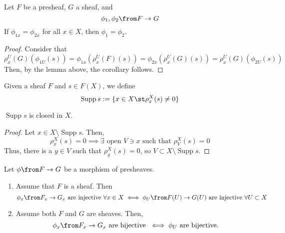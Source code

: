 \documentclass[11pt,leqno,oneside]{amsbook}
\renewcommand{\F}{F} %
\newcommand{\G}{G}
\DeclareMathOperator{\Supp}{Supp} %
\numberwithin{thm}{section}
\begin{document}
\begin{cor}\label{equality-of-induced-stalk-maps-implies-equality-of-maps}
  Let \(\F\) be a presheaf, \(\G\) a sheaf, and \[
    \phi_1, \phi_2 \from \F \to \G
  \]
  If \(\phi_{1x} = \phi_{2x}\) for all \(x \in X\), then \(\phi_1 =
  \phi_2\). 
\end{cor}
\begin{proof}
  Consider that \[
    \rho^U_x(\G)(\phi_{1U}(s)) = \phi_{1x}(\rho_x^U(\F)(s)) =
    \phi_{2x}(\rho^U_x(\G)(s)) = \rho^U_x(\G)(\phi_{2U}(s))
  \]
  Then, by the lemma above, the corollary follows.
\end{proof}
\begin{defn}
  Given a sheaf \(\F\) and \(s \in \F(X)\), we define \[
    \Supp s := \{x \in X \st \rho^X_x(s) \neq 0\}
  \]
\end{defn}
\begin{prop}
  \(\Supp s\) is closed in \(X\).
\end{prop}
\begin{proof}
  Let \(x \in X \setminus \Supp s\). Then, \[
    \rho^X_x(s) = 0 \implies \exists \text{ open } V \ni x \text{ such that }
    \rho^X_V(s) = 0
  \]
  Thus, there is a \(y \in V\) such that \(\rho^X_y(s) = 0\), so \(V
  \subset X \setminus \Supp s\).
\end{proof}
\begin{prop}\label{inj-and-bij-lift-from-stalk}
  Let \(\phi \from \F \to \G\) be a morphism of presheaves.
  \begin{enumerate}
  \item Assume that \(\F\) is a sheaf. Then \[
      \phi_x \from \F_x \to \G_x \text{ are injective }\forall x \in X
      \iff \phi_U \from \F(U) \to \G(U) \text{ are injective }\forall
      U \subset X
    \]
  \item Assume both \(\F\) and \(\G\) are sheaves. Then, \[
      \phi_x \from \F_x \to \G_x \text{ are bijective }\iff \phi_U
      \text{ are bijective.}
    \]
  \end{enumerate}
\end{prop}
\end{document}
